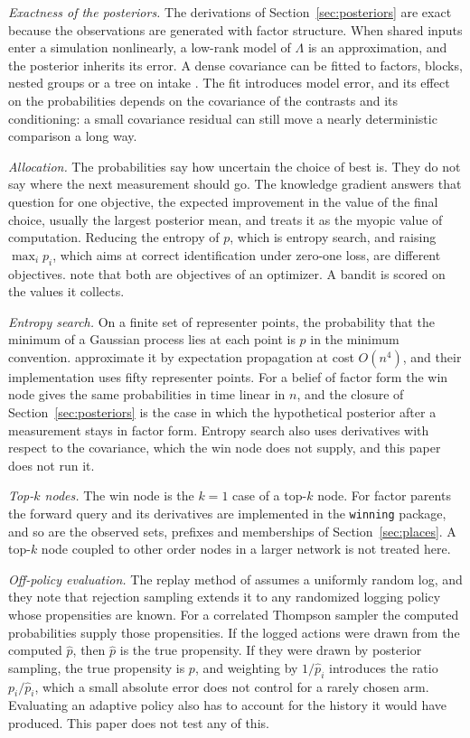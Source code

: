 \documentclass[11pt]{article}
\begin{document}
\emph{Exactness of the posteriors.} The derivations of
Section~\ref{sec:posteriors} are exact because the observations are
generated with factor structure. When shared inputs enter a
simulation nonlinearly, a low-rank model of $\Lambda$ is an
approximation, and the posterior inherits its error. A dense
covariance can be fitted to factors, blocks, nested groups or a tree
on intake \citep{cotton2026}. The fit introduces model error, and its
effect on the probabilities depends on the covariance of the
contrasts and its conditioning: a small covariance residual can still
move a nearly deterministic comparison a long way.

\emph{Allocation.} The probabilities say how uncertain the choice of
best is. They do not say where the next measurement should go. The
knowledge gradient \citep{frazier2008} answers that question for one
objective, the expected improvement in the value of the final choice,
usually the largest posterior mean, and \citet{tuisov2026} treats it
as the myopic value of computation. Reducing the entropy of $p$,
which is entropy search, and raising $\max_i p_i$, which aims at
correct identification under zero-one loss, are different objectives.
\citet{hennig2012} note that both are objectives of an optimizer. A
bandit is scored on the values it collects.

\emph{Entropy search.} On a finite set of representer points, the
probability that the minimum of a Gaussian process lies at each point
is $p$ in the minimum convention. \citet{hennig2012} approximate it by
expectation propagation at cost $O(n^4)$, and their implementation
uses fifty representer points. For a belief of factor form the win
node gives the same probabilities in time linear in $n$, and the
closure of Section~\ref{sec:posteriors} is the case in which the
hypothetical posterior after a measurement stays in factor form.
Entropy search also uses derivatives with respect to the covariance,
which the win node does not supply, and this paper does not run it.

\emph{Top-$k$ nodes.} The win node is the $k=1$ case of a top-$k$
node. For factor parents the forward query and its derivatives are
implemented in the \texttt{winning} package, and so are the observed
sets, prefixes and memberships of Section~\ref{sec:places}. A top-$k$
node coupled to other order nodes in a larger network is not treated
here.

\emph{Off-policy evaluation.} The replay method of \citet{li2011}
assumes a uniformly random log, and they note that rejection sampling
extends it to any randomized logging policy whose propensities are
known. For a correlated Thompson sampler the computed probabilities
supply those propensities. If the logged actions were drawn from the
computed $\hat p$, then $\hat p$ is the true propensity. If they were
drawn by posterior sampling, the true propensity is $p$, and weighting
by $1/\hat p_i$ introduces the ratio $p_i/\hat p_i$, which a small
absolute error does not control for a rarely chosen arm. Evaluating
an adaptive policy also has to account for the history it would have
produced. This paper does not test any of this.
\end{document}
